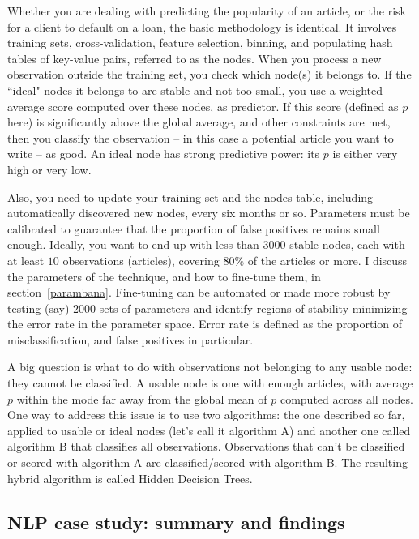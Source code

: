 \documentclass[oneside,10pt]{book}
\begin{document}
Whether you are dealing with predicting the popularity of an article, or the risk for a client to default on a loan, the basic methodology is identical. It involves training sets, \textcolor{index}{cross-validation}, \textcolor{index}{feature selection}, \textcolor{index}{binning}, and populating hash tables of key-value pairs, referred to as the nodes.
When you process a new observation outside the training set, you check which node(s) it belongs to. If the ``ideal" nodes it belongs to are stable and not too small, you use a weighted average score computed over these nodes, as predictor.  If this score (defined as $p$ here) is significantly above the global average, and other constraints are met, then you classify the observation -- in this case a potential article  you want to write -- as good. An ideal node has strong \textcolor{index}{predictive power}: its $p$ is either
  very high or very low.

Also, you need to update your training set and the nodes table, including automatically discovered new nodes, every six months or so.
Parameters must be calibrated to guarantee that the proportion of false positives  remains small enough. Ideally, you want to end up with
 less than $\num{3000}$ stable nodes, each with at least $10$ observations (articles), covering $80\%$ of the articles or more.
I discuss the parameters of the technique, and how to fine-tune them, in section~\ref{parambana}. Fine-tuning can be automated or made more robust by testing (say)
$\num{2000}$ sets of parameters and identify regions of stability minimizing the error rate in the parameter space.  Error rate is defined as the proportion of misclassification, and false positives in particular.

A big question is what to do with observations not belonging to any usable node: they cannot be classified. A \textcolor{index}{usable node} is one with enough articles, with average $p$ within the mode far away from the global mean of $p$ computed across all nodes.
One way to address this issue is to use two algorithms: the one described so far, applied to usable or ideal nodes (let's call it algorithm A) and another one called algorithm B that classifies all observations. Observations that can't be classified or scored with algorithm A are classified/scored with algorithm B.
The resulting hybrid algorithm is called Hidden Decision Trees.


\subsection{NLP case study: summary and findings}
\end{document}
